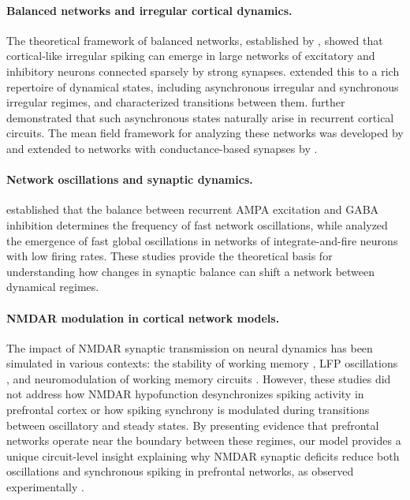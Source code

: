 \paragraph{Balanced networks and irregular cortical dynamics.}
The theoretical framework of balanced networks, established by
\citet{vanvreeswijk1996chaos}, showed that cortical-like irregular spiking can
emerge in large networks of excitatory and inhibitory neurons connected sparsely
by strong synapses. \citet{brunel2000dynamics} extended this to a rich
repertoire of dynamical states, including asynchronous irregular and
synchronous irregular regimes, and characterized transitions between them.
\citet{renart2010asynchronous} further demonstrated that such asynchronous
states naturally arise in recurrent cortical circuits. The mean field
framework for analyzing these networks was developed by
\citet{amit1997model, brunel2000dynamics} and extended to networks with
conductance-based synapses by \citet{brunel2001effects}.

\paragraph{Network oscillations and synaptic dynamics.}
\citet{brunel2003fast} established that the balance between recurrent AMPA
excitation and GABA inhibition determines the frequency of fast network
oscillations, while \citet{brunel1999fast} analyzed the emergence of fast
global oscillations in networks of integrate-and-fire neurons with low firing
rates. These studies provide the theoretical basis for understanding how
changes in synaptic balance can shift a network between dynamical regimes.

\paragraph{NMDAR modulation in cortical network models.}
The impact of NMDAR synaptic transmission on neural dynamics has been
simulated in various contexts: the stability of working memory
\citep{wang1999synaptic, compte2000synaptic}, LFP oscillations
\citep{brunel2003fast}, and neuromodulation of working memory circuits
\citep{brunel2001effects}. However, these studies did not address how NMDAR
hypofunction desynchronizes spiking activity in prefrontal cortex or how
spiking synchrony is modulated during transitions between oscillatory and
steady states. By presenting evidence that prefrontal networks operate near
the boundary between these regimes, our model provides a unique circuit-level
insight explaining why NMDAR synaptic deficits reduce both oscillations and
synchronous spiking in prefrontal networks, as observed experimentally
\citep{zick2018blocking}.

